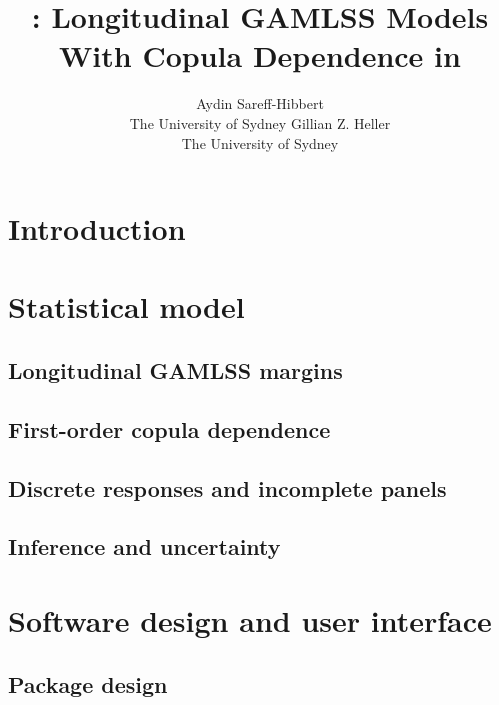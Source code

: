 \documentclass{jss}
\author{
  Aydin Sareff-Hibbert\\The University of Sydney
  \And
  Gillian Z. Heller\\The University of Sydney
}
\title{\pkg{gamlss.longitudinal}: Longitudinal GAMLSS Models With Copula Dependence in \proglang{R}}
\begin{document}
\section{Introduction}


\section{Statistical model}

\subsection{Longitudinal GAMLSS margins}


\subsection{First-order copula dependence}


\subsection{Discrete responses and incomplete panels}


\subsection{Inference and uncertainty}


\section{Software design and user interface}

\subsection{Package design}
\end{document}
